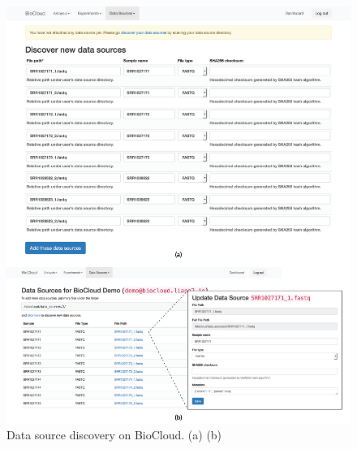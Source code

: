 \begin{figure}[!tbp]
\centering
\includegraphics[width=1\textwidth]{images/biocloud_data_source}
\caption[Data source discovery on BioCloud]{
    Data source discovery on BioCloud.
    (a)
    (b)
}
\label{fig:biocloud-data-source}
\end{figure}

